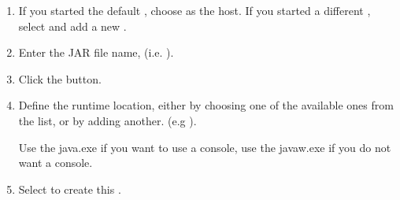 \begin{enumerate}
\item If you started the default \gdagent, choose  as the \gdagent{} host. If you started a different \gdagent, select  and add a new \gdagent {}. 
\item Enter the JAR file name, 
(i.e. ). 
\item Click the  button.
\item Define the  runtime location, either by choosing one 
of the available ones from the list, or by adding another. 
(e.g 
). 

Use the java.exe if you want to use a console, use the javaw.exe if you do not want a console.
\item Select  to create this \gdproject{}. 
\end{enumerate}

